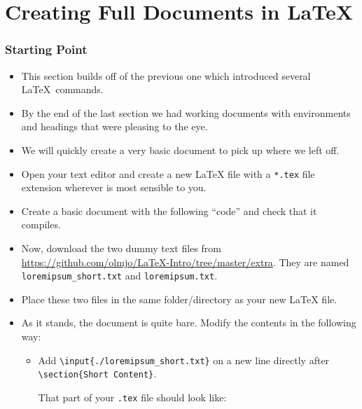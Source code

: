 \part{Creating Full Documents in \LaTeX}

\section{Starting Point}

\begin{itemize}

\item This section builds off of the previous one which introduced several
  \LaTeX{}~commands.

\item By the end of the last section we had working documents with environments
  and headings that were pleasing to the eye.

\item We will quickly create a very basic document to pick up where we
  left off.

\item Open your text editor and create a new \LaTeX{} file with a \texttt{*.tex}
  file extension wherever is most sensible to you.

\item Create a basic document with the following ``code'' and check that
  it compiles.



\item Now, download the two dummy text files from
  \url{https://github.com/olmjo/LaTeX-Intro/tree/master/extra}. They are named
  \verb=loremipsum_short.txt= and \verb=loremipsum.txt=.

\item Place these two files in the same folder/directory as your new \LaTeX{}
  file.

\item As it stands, the document is quite bare. Modify the contents in the
  following way:
  \begin{itemize}

  \item Add \texttt{\textbackslash input\{./loremipsum\_short.txt\}}
    on a new line directly after \texttt{\textbackslash section\{Short
      Content\}}.

    That part of your \texttt{.tex} file should look like:


\end{itemize}
\end{itemize}
